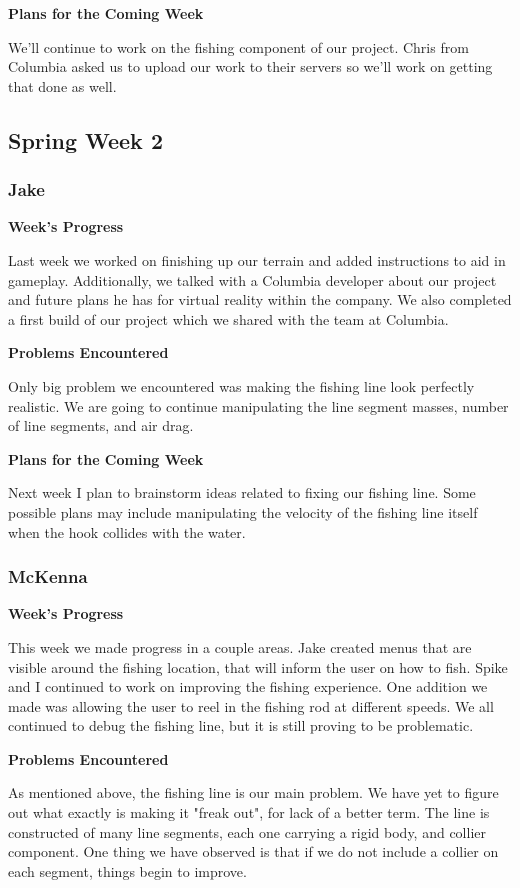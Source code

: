 \documentclass[10pt,journal,compsoc,onecolumn, draftclsnofoot]{IEEEtran}
\begin{document}
\noindent \textbf{Plans for the Coming Week}

We'll continue to work on the fishing component of our project. Chris from Columbia asked us to upload our work to their servers so we'll work on getting that done as well.

\subsection{Spring Week 2}
\subsubsection{Jake}
\noindent \textbf{Week's Progress}

Last week we worked on finishing up our terrain and added instructions to aid in gameplay. Additionally, we talked with a Columbia developer about our project and future plans he has for virtual reality within the company. We also completed a first build of our project which we shared with the team at Columbia.

\noindent \textbf{Problems Encountered}

Only big problem we encountered was making the fishing line look perfectly realistic. We are going to continue manipulating the line segment masses, number of line segments, and air drag.

\noindent \textbf{Plans for the Coming Week}

Next week I plan to brainstorm ideas related to fixing our fishing line. Some possible plans may include manipulating the velocity of the fishing line itself when the hook collides with the water.

\subsubsection{McKenna}
\noindent \textbf{Week's Progress}

This week we made progress in a couple areas. Jake created menus that are visible around the fishing location, that will inform the user on how to fish. Spike and I continued to work on improving the fishing experience. One addition we made was allowing the user to reel in the fishing rod at different speeds. We all continued to debug the fishing line, but it is still proving to be problematic.

\noindent \textbf{Problems Encountered}

As mentioned above, the fishing line is our main problem. We have yet to figure out what exactly is making it "freak out", for lack of a better term. The line is constructed of many line segments, each one carrying a rigid body, and collier component. One thing we have observed is that if we do not include a collier on each segment, things begin to improve.
\end{document}
